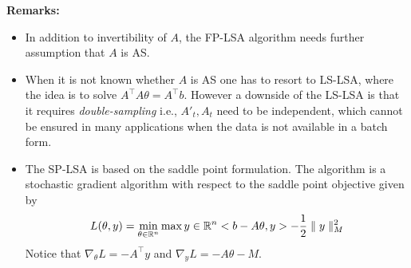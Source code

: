 \textbf{Remarks:}
\begin{itemize}[leftmargin=*]
\item In addition to invertibility of $A$, the FP-LSA algorithm needs further assumption that $A$ is AS.
\item When it is not known whether $A$ is AS one has to resort to LS-LSA, where the idea is to solve $A^{\top} A\theta=A^{\top} b$. However a downside of the LS-LSA is that it requires \emph{double-sampling} i.e., $A'_t,A_t$ need to be independent, which cannot be ensured in many applications when the data is not available in a batch form.
\item The SP-LSA is based on the saddle point formulation. The algorithm is a stochastic gradient algorithm with respect to the saddle point objective given by
\begin{align}
L(\theta,y)=\min_{\theta\in \mathbb{R}^n}\max{y\in \mathbb{R}^n}<b-A\theta,y>-\frac{1}{2}\parallel y\parallel_M ^2
\end{align}
Notice that $\nabla_\theta L =-A^\top y$ and $\nabla_{y}L=-A\theta-M$.
\end{itemize}
